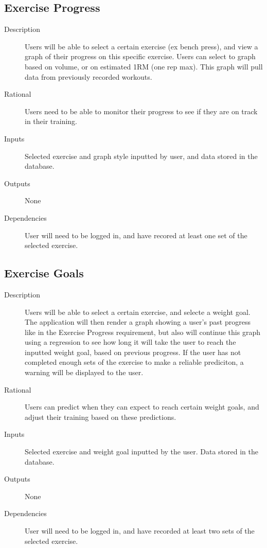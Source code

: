 \documentclass[12pt]{article}
\begin{document}
\subsection{Exercise Progress}
\begin{description}
	\item[Description] Users will be able to select a certain exercise (ex bench press), and view a graph of their progress on this specific exercise. Users can select to graph based on volume, or on estimated 1RM (one rep max). This graph will pull data from previously recorded workouts. 
	\item[Rational] Users need to be able to monitor their progress to see if they are on track in their training.
	\item[Inputs] Selected exercise and graph style inputted by user, and data stored in the database.
	\item[Outputs] None
	\item[Dependencies] User will need to be logged in, and have recored at least one set of the selected exercise.
\end{description}

\subsection{Exercise Goals}
\begin{description}
	\item[Description] Users will be able to select a certain exercise, and selecte a weight goal. The application will then render a graph showing a user's past progress like in the Exercise Progress requirement, but also will continue this graph using a regression to see how long it will take the user to reach the inputted weight goal, based on previous progress. If the user has not completed enough sets of the exercise to make a reliable prediciton, a warning will be displayed to the user.
	\item[Rational] Users can predict when they can expect to reach certain weight goals, and adjust their training based on these predictions.
	\item[Inputs] Selected exercise and weight goal inputted by the user. Data stored in the database.
	\item[Outputs] None
	\item[Dependencies] User will need to be logged in, and have recorded at least two sets of the selected exercise.
\end{description}
\end{document}
